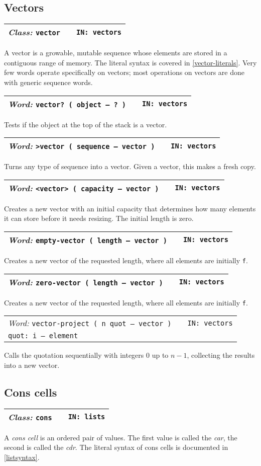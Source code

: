 \documentclass{report}
\newcommand{\ordinaryword}[3]{\index{#1}
\emph{Word:} \texttt{#2} &&\texttt{IN: #3}}
\newcommand{\classword}[2]{\index{#1}
\emph{Class:} \texttt{#1} &&\texttt{IN: #2}}
\newcommand{\wordtable}[1]{

\begin{tabularx}{12cm}[t]{lXr}
\hline
#1\\
\hline
\end{tabularx}

}
\begin{document}
\subsection{Vectors}

\wordtable{
\classword{vector}{vectors}
}
\vectorglos
A vector is a growable, mutable sequence whose elements are stored in a contiguous range of memory. The literal syntax is covered in \ref{vector-literals}. Very few words operate specifically on vectors; most operations on vectors are done with generic sequence words.

\wordtable{
\ordinaryword{vector?}{vector?~( object -- ?~)}{vectors}
}
Tests if the object at the top of the stack is a vector.
\wordtable{
\ordinaryword{>vector}{>vector~( sequence -- vector )}{vectors}
}
Turns any type of sequence into a vector. Given a vector, this makes a fresh copy.
\wordtable{
\ordinaryword{<vector>}{<vector>~( capacity -- vector )}{vectors}
}
Creates a new vector with an initial capacity that determines how many elements it can store before it needs resizing. The initial length is zero.
\wordtable{
\ordinaryword{empty-vector}{empty-vector~( length -- vector )}{vectors}
}
Creates a new vector of the requested length, where all elements are initially \texttt{f}.
\wordtable{
\ordinaryword{zero-vector}{zero-vector~( length -- vector )}{vectors}
}
Creates a new vector of the requested length, where all elements are initially \texttt{f}.
\wordtable{
\ordinaryword{vector-project}{vector-project~( n quot -- vector )}{vectors}\\
\texttt{quot:~i -- element}
}
Calls the quotation sequentially with integers $0$ up to $n-1$, collecting the results into a new vector.

\subsection{Cons cells}

\consglos
{}

\wordtable{
\classword{cons}{lists}
}
A \emph{cons cell} is an ordered pair of values. The first value is called the \emph{car},
the second is called the \emph{cdr}. The literal syntax of cons cells is documented in \ref{listsyntax}.
\end{document}

